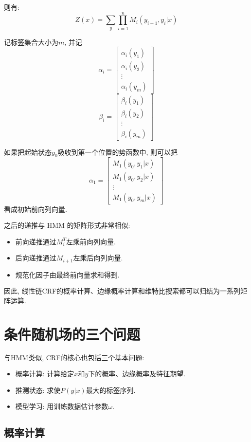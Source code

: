 则有:
\[
Z(x) = \sum_y \prod_{i=1}^n M_i (y_{i-1}, y_i | x)
\]

记标签集合大小为$m$, 并记
\[
\alpha_i = \begin{bmatrix}\alpha_i(y_1) \\ \alpha_i(y_2) \\ \vdots \\ \alpha_i(y_m)\end{bmatrix}
\]
\[
\beta_i = \begin{bmatrix}\beta_i(y_1) \\ \beta_i(y_2) \\ \vdots \\ \beta_i(y_m)\end{bmatrix}
\]

如果把起始状态$y_0$吸收到第一个位置的势函数中, 则可以把
\[
\alpha_1 = \begin{bmatrix}M_1(y_0, y_1 | x) \\ M_1(y_0, y_2 | x) \\ \vdots \\ M_1(y_0, y_m | x)\end{bmatrix}
\]
看成初始前向列向量.

之后的递推与 HMM 的矩阵形式非常相似:

\begin{itemize}
\item 前向递推通过$M_i^T$左乘前向列向量.
\item 后向递推通过$M_{i+1}$左乘后向列向量.
\item 规范化因子由最终前向量求和得到.
\end{itemize}

因此, 线性链CRF的概率计算、边缘概率计算和维特比搜索都可以归结为一系列矩阵运算.

\section{条件随机场的三个问题}


与HMM类似, CRF的核心也包括三个基本问题:

\begin{itemize}
\item 概率计算: 计算给定$x$和$y$下的概率、边缘概率及特征期望.
\item 推测状态: 求使$P(y|x)$最大的标签序列.
\item 模型学习: 用训练数据估计参数$\omega$.
\end{itemize}

\subsection{概率计算}


